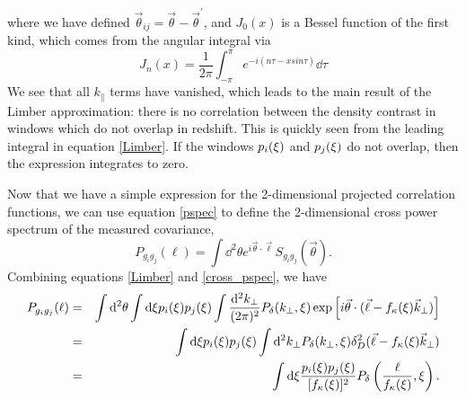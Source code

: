 where we have defined $\vec \theta_{ij} = \vec{\theta} -\vec{\theta}^\prime$, 
and $J_0(x)$ is a Bessel function of the first kind, which comes from 
the angular integral via
\begin{equation}
  \label{bessel_j}
  J_n(x) = \frac{1}{2\pi}\int_{-\pi}^{\pi} e^{-i(n\tau-x sin\tau)}\dd\tau
\end{equation}
We see that all $k_\parallel$ terms have vanished, which leads to the main
result of the Limber approximation: there is no correlation between the 
density contrast in windows which do not overlap 
in redshift. This is quickly seen from the leading integral in equation 
\ref{Limber}.  If the windows $p_i(\xi)$ and $p_j(\xi)$ do 
not overlap, then the expression integrates to zero.  

Now that we have a simple expression for the 2-dimensional projected 
correlation functions, we can use equation \ref{pspec} to define the 
2-dimensional cross power spectrum of the measured covariance,
\begin{equation} 
  \label{cross_pspec}
  P_{g_ig_j}(\ell) = \int \dd^2\theta e^{i\vec\theta\cdot\vec\ell}S_{g_ig_j}(\vec\theta).
\end{equation}
Combining equations \ref{Limber} and \ref{cross_pspec}, we have
\begin{eqnarray}
  \label{cross_pspec2}
  P_{g_ig_j}(\ell) 
  &=& \int \mathrm{d}^2\theta
  \int \mathrm{d}\xi p_i(\xi)p_j(\xi)
  \int \frac{\mathrm{d}^2k_\perp}{(2\pi)^2}
  P_\delta(k_\perp,\xi)
  \exp\left[i\vec\theta\cdot(\vec\ell- f_\kappa(\xi) 
    \vec k_\perp)\right]\nonumber\\
  &=&\int \mathrm{d}\xi p_i(\xi)p_j(\xi)\int \mathrm{d}^2k_\perp
  P_\delta(k_\perp,\xi)\delta_D^2(\vec\ell- f_\kappa(\xi)\vec k_\perp)
  \nonumber\\
  &=& \int \mathrm{d}\xi\frac{p_i(\xi)p_j(\xi)}{[f_\kappa(\xi)]^2}P_\delta\left(\frac{\ell}{f_\kappa(\xi)},\xi\right).
\end{eqnarray}

